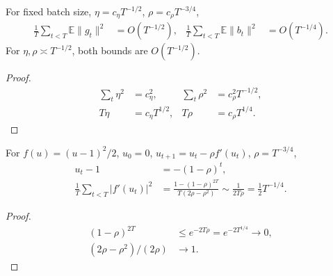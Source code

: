 \begin{corollary}
For fixed batch size, $\eta=c_\eta T^{-1/2}$, $\rho=c_\rho T^{-3/4}$,
\begin{align}\label{eq:separate-rates}
 \frac1T\sum_{t<T}\mathbb E\|g_t\|^2&=O(T^{-1/2}),&
 \frac1T\sum_{t<T}\mathbb E\|b_t\|^2&=O(T^{-1/4}).
\end{align}
For $\eta,\rho\asymp T^{-1/2}$, both bounds are $O(T^{-1/2})$.
\end{corollary}
\begin{proof}
\begin{align}
 \sum_t\eta^2&=c_\eta^2,&\sum_t\rho^2&=c_\rho^2T^{-1/2},\\
 T\eta&=c_\eta T^{1/2},&T\rho&=c_\rho T^{1/4}.
\end{align}
\end{proof}

\begin{proposition}
For $f(u)=(u-1)^2/2$, $u_0=0$, $u_{t+1}=u_t-\rho f'(u_t)$,
$\rho=T^{-3/4}$,
\begin{align}
 u_t-1&=-(1-\rho)^t,\\
 \frac1T\sum_{t<T}|f'(u_t)|^2
 &=\frac{1-(1-\rho)^{2T}}{T(2\rho-\rho^2)}
 \sim\frac1{2T\rho}=\tfrac12T^{-1/4}.
\end{align}
\end{proposition}
\begin{proof}
\begin{align}
 (1-\rho)^{2T}&\le e^{-2T\rho}=e^{-2T^{1/4}}\longrightarrow0,\\
 (2\rho-\rho^2)/(2\rho)&\longrightarrow1.
\end{align}
\end{proof}
